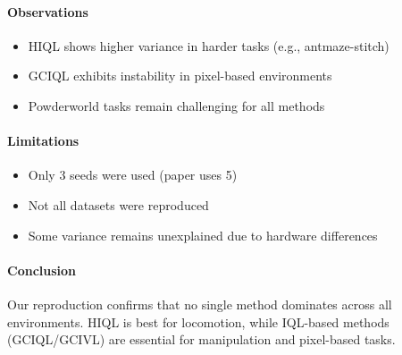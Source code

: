 \documentclass[11pt]{article}
\begin{document}
\paragraph{Observations}

\begin{itemize}
\item HIQL shows higher variance in harder tasks (e.g., antmaze-stitch)
\item GCIQL exhibits instability in pixel-based environments
\item Powderworld tasks remain challenging for all methods
\end{itemize}

\paragraph{Limitations}

\begin{itemize}
\item Only 3 seeds were used (paper uses 5)
\item Not all datasets were reproduced
\item Some variance remains unexplained due to hardware differences
\end{itemize}

\paragraph{Conclusion}

Our reproduction confirms that no single method dominates across all environments.
HIQL is best for locomotion, while IQL-based methods (GCIQL/GCIVL) are essential
for manipulation and pixel-based tasks.





   

\end{document}
